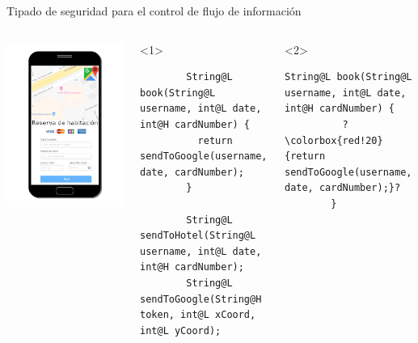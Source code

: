 \documentclass[aspectratio=169,10pt]{beamer}
\begin{document}
\begin{frame}[fragile]{Tipado de seguridad para el control de flujo de información}

  \begin{columns}[T,onlytextwidth]
    \includegraphics[width=1.0\textwidth]{images/book.png}
    \vspace{1cm}
    \begin{onlyenv}<1>
      \begin{lstlisting}
        String@L book(String@L username, int@L date, int@H cardNumber) {
          return sendToGoogle(username, date, cardNumber);
        }

        String@L sendToHotel(String@L username, int@L date, int@H cardNumber);
        String@L sendToGoogle(String@H token, int@L xCoord, int@L yCoord);
      \end{lstlisting}
    \end{onlyenv}
    \begin{onlyenv}<2>
      \begin{lstlisting}[escapechar=?]
        String@L book(String@L username, int@L date, int@H cardNumber) {
          ?\colorbox{red!20}{return sendToGoogle(username, date, cardNumber);}?
        }


\end{lstlisting}
\end{onlyenv}
\end{columns}
\end{frame}
\end{document}
